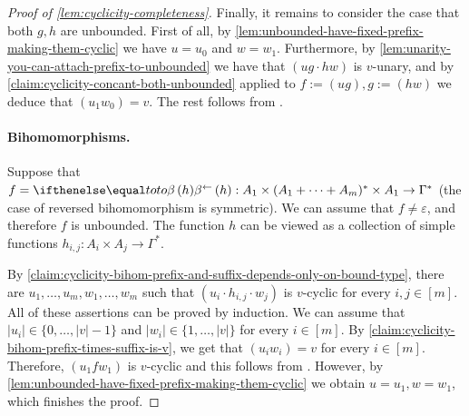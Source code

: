 \begin{proof}[Proof of \cref{lem:cyclicity-completeness}]
    Finally, it remains to consider the case that both $g,h$ are unbounded. First of all, by \cref{lem:unbounded-have-fixed-prefix-making-them-cyclic} we have $u = u_0$ and $w = w_1$. Furthermore, by \cref{lem:unarity-you-can-attach-prefix-to-unbounded} we have that $(u g \cdot h w)$ is $v$-unary, and by \cref{claim:cyclicity-concant-both-unbounded} applied to $f := (u g), g := (h w)$ we deduce that $(u_1 w_0) = v$. The rest follows from . 

    \paragraph{Bihomomorphisms.} Suppose that $f = \bihom{to, h} : A_1 \times (A_1 + \dots + A_m)^* \times A_1 \to \Gamma^*$ (the case of reversed bihomomorphism is symmetric). We can assume that $f \neq \varepsilon$, and therefore $f$ is unbounded. The function $h$ can be viewed as a collection of simple functions $h_{i,j} : A_i \times A_j \to \Gamma^*$.

    By \cref{claim:cyclicity-bihom-prefix-and-suffix-depends-only-on-bound-type}, there are $u_1, \dots, u_m, w_1, \dots, w_m$ such that $(u_i \cdot h_{i,j} \cdot w_j)$ is $v$-cyclic for every $i,j \in [m]$. All of these assertions can be proved by induction. We can assume that $|u_i| \in \{0, \dots, |v|-1 \}$ and $|w_i| \in \{1, \dots, |v| \}$ for every $i \in [m]$. By \cref{claim:cyclicity-bihom-prefix-times-suffix-is-v}, we get that $(u_i w_i) = v$ for every $i \in [m]$. Therefore, $(u_1 f w_1)$ is $v$-cyclic and this follows from . However, by \cref{lem:unbounded-have-fixed-prefix-making-them-cyclic} we obtain $u = u_1, w = w_1$, which finishes the proof.
\end{proof}


